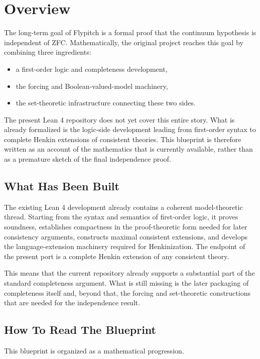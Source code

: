 \chapter{Overview}
\label{chap:overview}

The long-term goal of Flypitch is a formal proof that the continuum hypothesis
is independent of ZFC. Mathematically, the original project reaches this goal
by combining three ingredients:
\begin{itemize}
\item a first-order logic and completeness development,
\item the forcing and Boolean-valued-model machinery,
\item the set-theoretic infrastructure connecting these two sides.
\end{itemize}

The present Lean 4 repository does not yet cover this entire story. What is
already formalized is the logic-side development leading from first-order
syntax to complete Henkin extensions of consistent theories. This blueprint is
therefore written as an account of the mathematics that is currently available,
rather than as a premature sketch of the final independence proof.

\section{What Has Been Built}

The existing Lean 4 development already contains a coherent model-theoretic
thread. Starting from the syntax and semantics of first-order logic, it proves
soundness, establishes compactness in the proof-theoretic form needed for later
consistency arguments, constructs maximal consistent extensions, and develops
the language-extension machinery required for Henkinization. The endpoint of
the present port is a complete Henkin extension of any consistent theory.

This means that the current repository already supports a substantial part of
the standard completeness argument. What is still missing is the later
packaging of completeness itself and, beyond that, the forcing and set-theoretic
constructions that are needed for the independence result.

\section{How To Read The Blueprint}

This blueprint is organized as a mathematical progression.

